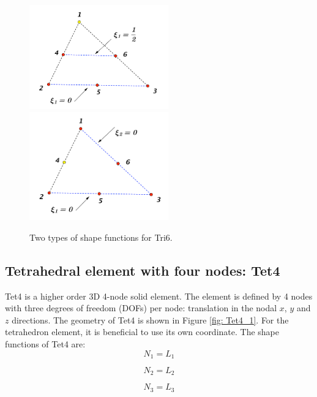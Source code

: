 \begin{figure}[h]
	\begin{center}
		\includegraphics[width=6cm,clip]{Tri6_2.pdf}		
		\includegraphics[width=6cm,clip]{Tri6_3.pdf}		
		\caption{Two types of shape functions for Tri6.} \label{fig: Tri6_2}
		
	\end{center} 
\end{figure}


\subsection{Tetrahedral element with four nodes: Tet4}
Tet4 is a higher order 3D 4-node solid element. The element is defined by 4 nodes with three degrees of freedom (DOFs) per node: translation in the nodal $x$, $y$ and $z$ directions. The geometry of Tet4 is shown in Figure \ref{fig: Tet4_1}. For the tetrahedron element, it is beneficial to use its own coordinate. The shape functions of Tet4 are:
\begin{equation}
N_1 = L_1
\end{equation}

\begin{equation}
N_2 = L_2
\end{equation}

\begin{equation}
N_3 = L_3
\end{equation}

